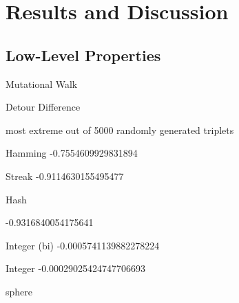 \section{Results and Discussion}

\subsection{Low-Level Properties}

Mutational Walk




Detour Difference



most extreme out of 5000 randomly generated triplets

Hamming
-0.7554609929831894

Streak
-0.9114630155495477

Hash

-0.9316840054175641

Integer (bi)
-0.0005741139882278224

Integer
-0.00029025424747706693

sphere



